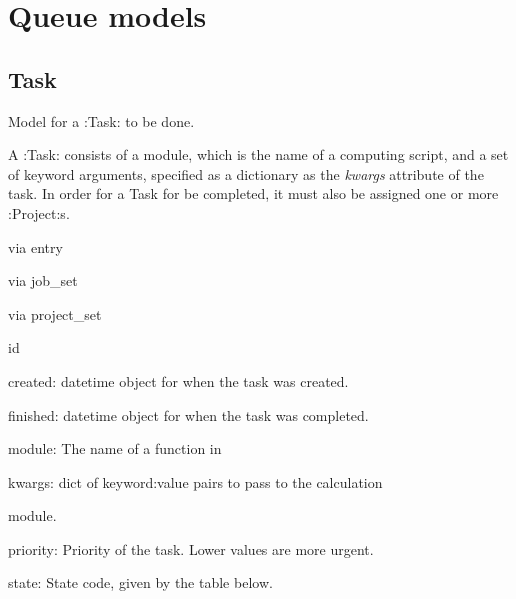 \documentclass[letterpaper,10pt,english]{sphinxmanual}
\begin{document}
\section{Queue models}
\label{models:queue-models}

\subsection{Task}
\label{models:task}

\begin{fulllineitems}
\label{models:qmpy.Task}
Model for a :Task: to be done.

A :Task: consists of a module, which is the name 
of a computing script, and a set of keyword arguments, specified as a
dictionary as the \emph{kwargs} attribute of the task. In order for a Task for
be completed, it must also be assigned one or more :Project:s.
\begin{description}
\item[{Relationships:}] \leavevmode
\begin{DUlineblock}{0em}
\item[] {\hyperref[models:qmpy.Entry]{}} via entry
\item[] {\hyperref[models:qmpy.Job]{}} via job\_set
\item[] {\hyperref[models:qmpy.Project]{}} via project\_set
\end{DUlineblock}

\item[{Attributes:}] \leavevmode
\begin{DUlineblock}{0em}
\item[] id
\item[] created: datetime object for when the task was created.
\item[] finished: datetime object for when the task was completed.
\item[] module: The name of a function in   
\item[] kwargs: dict of keyword:value pairs to pass to the calculation
\item[]
\begin{DUlineblock}{\DUlineblockindent}
\item[] module.
\end{DUlineblock}
\item[] priority: Priority of the task. Lower values are more urgent. 
\item[] state: State code, given by the table below.
\end{DUlineblock}


\end{description}
\end{fulllineitems}
\end{document}
